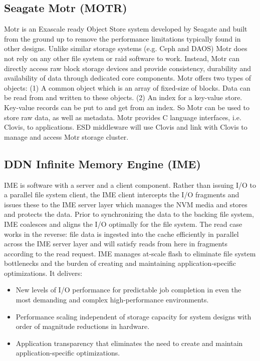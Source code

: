 \subsection{Seagate Motr (MOTR)}
Motr is an Exascale ready Object Store system developed by Seagate and built from the ground up to remove the performance limitations typically found in other designs. 
Unlike similar storage systems (e.g. Ceph and DAOS) Motr does not rely on any other file system or raid software to work. 
Instead, Motr can directly access raw block storage devices and provide consistency, durability and availability of data through dedicated core components.
Motr offers two types of objects: (1) A common object which is an array of fixed-size of blocks. 
Data can be read from and written to these objects. (2) An index for a key-value store. 
Key-value records can be put to and get from an index. So Motr can be used to store raw data, as well as metadata.
Motr provides C language interfaces, i.e. Clovis, to applications. 
ESD middleware will use Clovis and link with Clovis to manage and access Motr storage cluster.

\subsection{DDN Infinite Memory Engine (IME)}
IME is software with a server and a client component. 
Rather than issuing I/O to a parallel file system client, the IME client intercepts the I/O fragments and issues these to the IME server layer which manages the NVM media and stores and protects the data.
Prior to synchronizing the data to the backing file system, IME coalesces and aligns the I/O optimally for the file system. 
The read case works in the reverse: file data is ingested into the cache efficiently in parallel across the
IME server layer and will satisfy reads from here in fragments according to the read request. 
IME manages at-scale flash to eliminate file system bottlenecks and the burden of creating and maintaining application-specific optimizations. 
It delivers:

\begin{itemize}
  \item New levels of I/O performance for predictable job completion in even the most demanding and complex high-performance environments.
  \item Performance scaling independent of storage capacity for system designs with order of magnitude reductions in hardware.
  \item Application transparency that eliminates the need to create and maintain application-specific optimizations.
\end{itemize}

